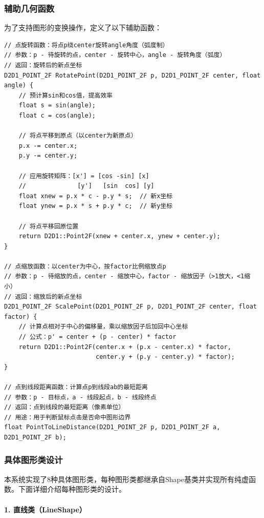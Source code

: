 \documentclass[12pt,a4paper]{article}
\begin{document}
\subsubsection{辅助几何函数}

为了支持图形的变换操作，定义了以下辅助函数：

\begin{lstlisting}[caption=辅助几何函数]
// 点旋转函数：将点p绕center旋转angle角度（弧度制）
// 参数：p - 待旋转的点，center - 旋转中心，angle - 旋转角度（弧度）
// 返回：旋转后的新点坐标
D2D1_POINT_2F RotatePoint(D2D1_POINT_2F p, D2D1_POINT_2F center, float angle) {
    // 预计算sin和cos值，提高效率
    float s = sin(angle);
    float c = cos(angle);
    
    // 将点平移到原点（以center为新原点）
    p.x -= center.x;
    p.y -= center.y;
    
    // 应用旋转矩阵：[x'] = [cos -sin] [x]
    //              [y']   [sin  cos] [y]
    float xnew = p.x * c - p.y * s;  // 新x坐标
    float ynew = p.x * s + p.y * c;  // 新y坐标
    
    // 将点平移回原位置
    return D2D1::Point2F(xnew + center.x, ynew + center.y);
}

// 点缩放函数：以center为中心，按factor比例缩放点p
// 参数：p - 待缩放的点，center - 缩放中心，factor - 缩放因子（>1放大，<1缩小）
// 返回：缩放后的新点坐标
D2D1_POINT_2F ScalePoint(D2D1_POINT_2F p, D2D1_POINT_2F center, float factor) {
    // 计算点相对于中心的偏移量，乘以缩放因子后加回中心坐标
    // 公式：p' = center + (p - center) * factor
    return D2D1::Point2F(center.x + (p.x - center.x) * factor, 
                         center.y + (p.y - center.y) * factor);
}

// 点到线段距离函数：计算点p到线段ab的最短距离
// 参数：p - 目标点，a - 线段起点，b - 线段终点
// 返回：点到线段的最短距离（像素单位）
// 用途：用于判断鼠标点击是否命中图形边界
float PointToLineDistance(D2D1_POINT_2F p, D2D1_POINT_2F a, D2D1_POINT_2F b);
\end{lstlisting}

\subsubsection{具体图形类设计}

本系统实现了8种具体图形类，每种图形类都继承自Shape基类并实现所有纯虚函数。下面详细介绍每种图形类的设计。

\paragraph{1. 直线类（LineShape）}
\end{document}
